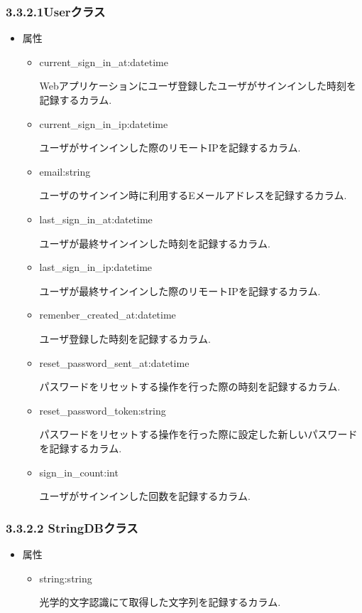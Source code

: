 \subsubsection{3.3.2.1Userクラス}
\begin{itemize}
\item 属性

\begin{itemize}
\item current\_sign\_in\_at:datetime

Webアプリケーションにユーザ登録したユーザがサインインした時刻を記録するカラム.

\item current\_sign\_in\_ip:datetime

ユーザがサインインした際のリモートIPを記録するカラム.

\item email:string

ユーザのサインイン時に利用するEメールアドレスを記録するカラム.

\item last\_sign\_in\_at:datetime

ユーザが最終サインインした時刻を記録するカラム.

\item last\_sign\_in\_ip:datetime

ユーザが最終サインインした際のリモートIPを記録するカラム.

\item remenber\_created\_at:datetime

ユーザ登録した時刻を記録するカラム.

\item reset\_password\_sent\_at:datetime

パスワードをリセットする操作を行った際の時刻を記録するカラム.

\item reset\_password\_token:string

パスワードをリセットする操作を行った際に設定した新しいパスワードを記録するカラム.

\item sign\_in\_count:int

ユーザがサインインした回数を記録するカラム.
\end{itemize}

\end{itemize}

\subsubsection{3.3.2.2 StringDBクラス}
\begin{itemize}
\item 属性

\begin{itemize}
\item string:string

光学的文字認識にて取得した文字列を記録するカラム.
\end{itemize}

\end{itemize}

